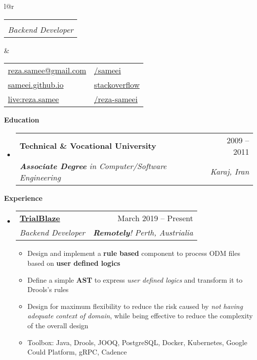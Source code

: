 \documentclass[letterpaper,12pt]{article}[leftmargin=*]
\makeatletter
\def \fullname {Reza Sameei}
\def \subtitle {Backend Developer}
\def \linkedinicon {\faLinkedin}
\def \linkedinlink {http://linkedin.com/in/reza-sameei/}
\def \linkedintext {/reza-sameei}
\def \phoneicon {\faPhone}
\def \phonetext {+98-912-666-2695}
\def \skypeicon {\faSkype}
\def \skypelink {http://joints..../}
\def \skypename {live:reza.samee}
\def \emailicon {\faEnvelope}
\def \emaillink {mailto:reza.samee@gmail.com}
\def \emailtext {reza.samee@gmail.com}
\def \githubicon {\faGithub}
\def \githublink {https://github.com/sameei}
\def \githubtext {/sameei}
\def \stacksiteicon {\faStackOverflow}
\def \stacksitelink {https://stackoverflow.com/users/998642/reza-sameei}
\def \stacksitetext {stackoverflow}
\def \websiteicon {\faGlobe}
\def \websitelink {https://sameei.github.io/}
\def \websitetext {sameei.github.io}
\def \headertype {\doublecol} %
\def \entryspacing {-0pt}
\def \linkedin {\linkedinicon \hspace{3pt}\href{\linkedinlink}{\linkedintext}}
\def \phone {\phoneicon \hspace{3pt}{ \phonetext}}
\def \skype {\skypeicon \hspace{3pt}\href{\skypelink}{\skypename}}
\def \email {\emailicon \hspace{3pt}\href{\emaillink}{\emailtext}}
\def \github {\githubicon \hspace{3pt}\href{\githublink}{\githubtext}}
\def \stackoverflow {\stacksiteicon \hspace{3pt}\href{\stacksitelink}{\stacksitetext}}
\def \website {\websiteicon \hspace{3pt}\href{\websitelink}{\websitetext}}
\renewcommand{\section}[2]{\vspace{5pt}
  \colorbox{secondary}{\color{white}\raggedbottom\normalsize\textbf{{#1}{\hspace{7pt}#2}}}
}
\newcommand{\resumeEntryStart}{\begin{itemize}[leftmargin=2.5mm]}
\newcommand{\resumeEntryEnd}{\end{itemize}\vspace{\entryspacing}}
\newcommand{\resumeItemListStart}{\begin{itemize}[leftmargin=4.5mm]}
\newcommand{\resumeItemListEnd}{\end{itemize}}
\newcommand{\resumeItem}[1]{
  \item\small{
    {#1 \vspace{-2pt}}
  }
}
\newcommand{\resumeEntryTSDL}[4]{
  \vspace{-1pt}\item[]
    \begin{tabular*}{0.97\textwidth}{l@{\extracolsep{\fill}}r}
      \textbf{\color{primary}#1} & {\firabook\color{accent}\small#2} \\
      \textit{\color{accent}\small#3} & \textit{\color{accent}\small#4} \\
    \end{tabular*}\vspace{-6pt}
}
\newcommand{\resumeEntryS}[2]{
  \item[]\small{
    \textbf{\color{primary}#1 }{ #2 \vspace{-6pt}}
  }
}
\newcommand{\doublecol}[6]{
  \begin{tabular*}{\textwidth}{l@{\extracolsep{\fill}}r}
    {
      \begin{tabular}[c]{l}
        \fontsize{35}{45}\selectfont{\color{primary}{{\textbf{\fullname}}}}
		\\
        {\textit{\subtitle}} %
      \end{tabular}
    } & {
      \begin{tabular}[c]{l@{\hspace{1.5em}}l}
        {\small#4} & {\small#1} \\
        {\small#5} & {\small#2} \\
        {\small#6} & {\small#3}
      \end{tabular}
    }
  \end{tabular*}
}
\newcommand{\singlecol}[6]{
  \begin{tabular*}{\textwidth}{l@{\extracolsep{\fill}}r}
    {
      \begin{tabular}[b]{l}
        \fontsize{35}{45}\selectfont{\color{primary}{{\textbf{\fullname}}}} \\
        {\textit{\subtitle}} %
      \end{tabular}
    } & {
      \begin{tabular}[c]{l}
        {\small#1} \\
        {\small#2} \\
        {\small#3} \\
        {\small#4} \\
        {\small#5} \\
        {\small#6}
      \end{tabular}
    }
  \end{tabular*}
}
\makeatother
\begin{document}


\headertype{\github}{\stackoverflow}{\linkedin}{\email}{\website}{\skype}{} %





\section{\faGraduationCap}{Education}

  \resumeEntryStart
    \resumeEntryTSDL
      {Technical \& Vocational University}{2009 -- 2011}
      {\textbf{Associate Degree} in Computer/Software Engineering}{Karaj, Iran}
  \resumeEntryEnd

\section{\faPieChart}{Experience}

  \resumeEntryStart
    \resumeEntryTSDL
      {\href{https://trialblaze.com}{TrialBlaze}}{March 2019 -- Present}
      {Backend Developer}{\textbf{Remotely}! Perth, Austrialia}
    \resumeItemListStart
	  \resumeItem { Design and implement a \textbf{rule based} component to process ODM files based on \textbf{user defined logics}}
      \resumeItem{Define a simple \textbf{AST} to express \textit{user defined logics} and transform it to Drools's rules}
      \resumeItem{Design for maximum flexibility to reduce the risk caused by \textit{not having adequate context of domain}, while being effective to reduce the complexity of the overall design}
      \resumeItem{Toolbox: Java, Drools, JOOQ, PostgreSQL, Docker, Kubernetes, Google Could Platform, gRPC, Cadence}
    \resumeItemListEnd
  \resumeEntryEnd
\end{document}
